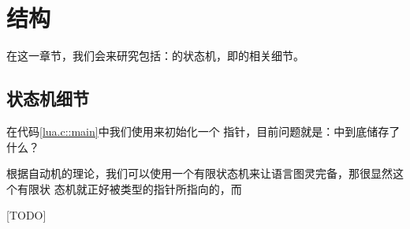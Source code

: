 

\chapter{结构}

在这一章节，我们会来研究包括：的状态机，即的相关细节。

\section{状态机细节}

在代码\ref{lua.c::main}中我们使用来初始化一个%
指针，目前问题就是：中到底储存了什么？

根据自动机的理论，我们可以使用一个有限状态机来让语言图灵完备，那很显然这个有限状
态机就正好被类型的指针所指向的，而

[TODO]

